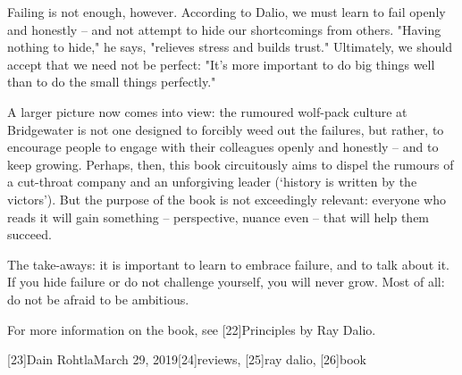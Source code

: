    Failing is not enough, however. According to Dalio, we must learn to
   fail openly and honestly -- and not attempt to hide our shortcomings
   from others. "Having nothing to hide," he says, "relieves stress and
   builds trust." Ultimately, we should accept that we need not be
   perfect: "It's more important to do big things well than to do the
   small things perfectly."

   A larger picture now comes into view: the rumoured wolf-pack culture at
   Bridgewater is not one designed to forcibly weed out the failures, but
   rather, to encourage people to engage with their colleagues openly and
   honestly -- and to keep growing. Perhaps, then, this book circuitously
   aims to dispel the rumours of a cut-throat company and an unforgiving
   leader (`history is written by the victors'). But the purpose of the
   book is not exceedingly relevant: everyone who reads it will gain
   something -- perspective, nuance even -- that will help them succeed.

   The take-aways: it is important to learn to embrace failure, and to
   talk about it. If you hide failure or do not challenge yourself, you
   will never grow. Most of all: do not be afraid to be ambitious.

   For more information on the book, see [22]Principles by Ray Dalio.

   [23]Dain RohtlaMarch 29, 2019[24]reviews, [25]ray dalio, [26]book
